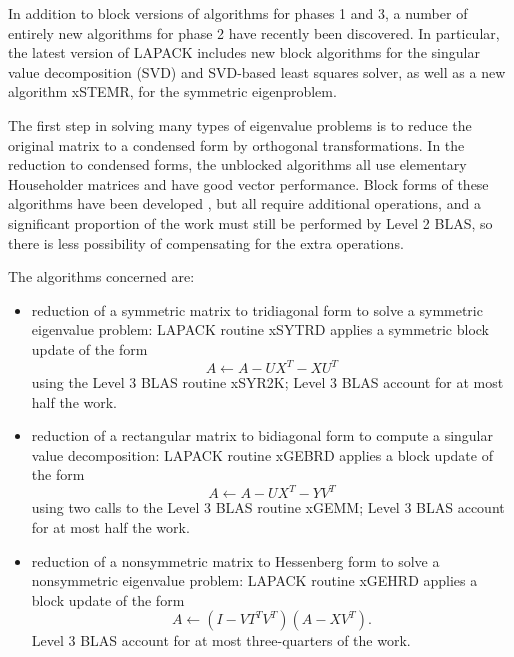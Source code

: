 In addition to block versions of algorithms for phases 1 and 3,
a number of entirely new algorithms for phase 2 have recently
been discovered.
In particular,
the latest version of LAPACK includes new block algorithms for the singular
value decomposition (SVD) and SVD-based least squares solver,
as well as a new algorithm
xSTEMR\cite{holygrail,parlettdhillon00,parlettmarques00,dhillonparlett03},
for the symmetric eigenproblem.

The first step in solving many types of eigenvalue problems is to reduce
the original matrix to a condensed form by orthogonal
transformations.
In the reduction to condensed forms, the unblocked algorithms all use
elementary
Householder matrices and have good vector performance.
Block forms of these algorithms have been developed \cite{lapwn2},
but all require additional operations, and a significant proportion of the
work
must still be performed by Level 2 BLAS, so there is less possibility of
compensating for the extra operations.

The algorithms concerned are:

\begin{itemize}

\item reduction of a symmetric matrix to tridiagonal form to solve a
symmetric eigenvalue problem: LAPACK routine xSYTRD
applies a symmetric block
update of the form
\[A \leftarrow A - U X^T - X U^T\]
 using the Level 3
BLAS routine xSYR2K;
Level 3 BLAS account for at most half the work.

\item reduction of a rectangular matrix to bidiagonal form to compute
a singular value decomposition: LAPACK routine xGEBRD
applies a block update
of the form
\[A \leftarrow A - U X^T - Y V^T\]
using two calls to the
Level 3 BLAS routine xGEMM; Level 3 BLAS account for at most half the
work.

\item reduction of a nonsymmetric matrix to Hessenberg form to solve a
nonsymmetric eigenvalue problem: LAPACK routine xGEHRD
applies a block update
of the form
\[A \leftarrow (I - V T^T V^T)(A - X V^T).\]
Level 3 BLAS
account for at most three-quarters of the work.

\end{itemize}

